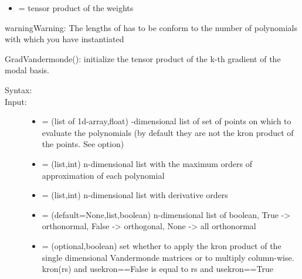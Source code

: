 \documentclass[letterpaper,10pt,english]{sphinxmanual}
\begin{document}
\begin{fulllineitems}
\begin{fulllineitems}
\begin{description}
\begin{itemize}
\item {} 
 = tensor product of the weights

\end{itemize}

\end{description}

\begin{notice}{warning}{Warning:}
The lengths of  has to be conform to the number of polynomials with which you have instantiated 
\end{notice}

\end{fulllineitems}


\begin{fulllineitems}
\label{index:SpectralToolbox.SpectralND.PolyND.GradVandermonde}
GradVandermonde(): initialize the tensor product of the k-th gradient of the modal basis.
\begin{description}
\item[{Syntax:}] \leavevmode
{}

\item[{Input:}] \leavevmode\begin{itemize}
\item {} 
 = (list of 1d-array,float) -dimensional list of set of points on which to evaluate the polynomials (by default they are not the kron product of the points. See  option)

\item {} 
 = (list,int) n-dimensional list with the maximum orders of approximation of each polynomial

\item {} 
 = (list,int) n-dimensional list with derivative orders

\item {} 
 = (default=None,list,boolean) n-dimensional list of boolean, True -\textgreater{} orthonormal, False -\textgreater{} orthogonal, None -\textgreater{} all orthonormal

\item {} 
 = (optional,boolean) set whether to apply the kron product of the single dimensional Vandermonde matrices or to multiply column-wise. kron(rs) and usekron==False is equal to rs and usekron==True


\end{itemize}
\end{description}
\end{fulllineitems}
\end{fulllineitems}
\end{document}
